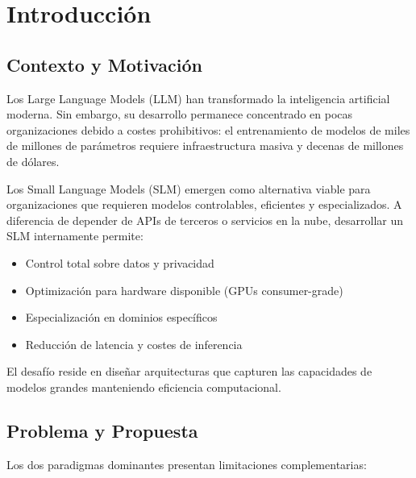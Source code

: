 \section{Introducción}
\label{sec:introduccion}

\subsection{Contexto y Motivación}

Los Large Language Models (LLM) han transformado la inteligencia artificial moderna. Sin embargo, su desarrollo permanece concentrado en pocas organizaciones debido a costes prohibitivos: el entrenamiento de modelos de miles de millones de parámetros requiere infraestructura masiva y decenas de millones de dólares.

Los Small Language Models (SLM) emergen como alternativa viable para organizaciones que requieren modelos controlables, eficientes y especializados. A diferencia de depender de APIs de terceros o servicios en la nube, desarrollar un SLM internamente permite:

\begin{itemize}
    \item Control total sobre datos y privacidad
    \item Optimización para hardware disponible (GPUs consumer-grade)
    \item Especialización en dominios específicos
    \item Reducción de latencia y costes de inferencia
\end{itemize}

El desafío reside en diseñar arquitecturas que capturen las capacidades de modelos grandes manteniendo eficiencia computacional.

\subsection{Problema y Propuesta}

Los dos paradigmas dominantes presentan limitaciones complementarias:

